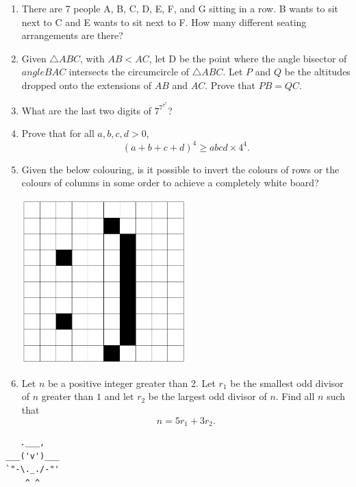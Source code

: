 \documentclass{article}
\begin{document}
\begin{enumerate}[1.]
\vspace{18pt}
\item %
There are 7 people A, B, C, D, E, F, and G sitting in a row. B wants to sit next to C and E wants to sit next to F. How many different seating arrangements are there?


\vspace{18pt}
\item %
Given $\triangle ABC$, with $AB < AC$, let D be the point where the angle bisector of $angle BAC$ intersects the circumcircle of $\triangle ABC$.
Let $P$ and $Q$ be the altitudes dropped onto the extensions of $AB$ and $AC$.
Prove that $PB = QC$.


\vspace{18pt}
\item %
What are the last two digits of $7^{7^{7^{7}}}$?
\vspace{6.81mm}


\vspace{18pt}
\item %
Prove that for all $a, b, c, d > 0$,
\[ (a + b + c + d)^{4} \geq abcd \times 4^{4}. \]


\vspace{18pt}
\item %
Given the below colouring, is it possible to invert the colours of rows or the colours of columns in some order to achieve a completely white board?
\begin{center}
	\includegraphics[width=0.5\textwidth]{test_5_q_1.png}
\end{center}


\vspace{18pt}
\item %
Let $n$ be a positive integer greater than 2. Let $r_1$ be the smallest odd divisor of $n$ greater than $1$ and let $r_2$ be the largest odd divisor of $n$. Find all $n$ such that
\[ n=5r_{1}+3r_{2}. \]


\end{enumerate}


\vspace{18pt}
\begin{center}
\begin{BVerbatim}
   .___,   
___('v')___
`"-\._./-"'
    ^ ^
\end{BVerbatim}
\end{center}
\end{document}
